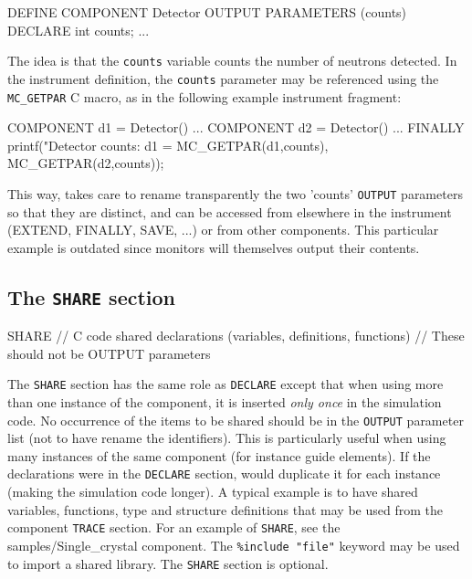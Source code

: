\begin{mcstas}
DEFINE COMPONENT Detector
OUTPUT PARAMETERS (counts)
DECLARE
  int counts;
...
\end{mcstas}

The idea is that the \texttt{counts} variable counts the number of neutrons detected. In
the instrument definition, the \texttt{counts} parameter may be referenced using
the \verb+MC_GETPAR+ C macro, as in the following example instrument
fragment:\label{mcgetpar}

\begin{mcstas}
COMPONENT d1 = Detector()
...
COMPONENT d2 = Detector()
...
FINALLY
  printf("Detector counts: d1 = %
         MC_GETPAR(d1,counts), MC_GETPAR(d2,counts));
\end{mcstas}

This way, \MCS takes care to rename transparently the two 'counts'
\texttt{OUTPUT} parameters so that they are distinct, and can be accessed from
elsewhere in the instrument (EXTEND, FINALLY, SAVE, ...)  or from other
components. This particular example is outdated since \MCS monitors will
themselves output their contents.

\subsection{The \texttt{SHARE} section}
\label{s:comp-share}
\begin{mcstas}
SHARE
// C code shared declarations (variables, definitions, functions)
// These should not be OUTPUT parameters
\end{mcstas}


The \texttt{SHARE} section has the same role as \texttt{DECLARE} except that
when using more than one instance of the component, it is inserted \emph{only
  once} in the simulation code. No occurrence of the items to be shared should be
in the \texttt{OUTPUT} parameter list (not to have \MCS rename the
identifiers).  This is particularly useful when using many instances of the same
component (for instance guide elements). If the declarations were in the
\texttt{DECLARE} section, \MCS would duplicate it for each instance (making the
simulation code longer).  A typical example is to have shared variables,
functions, type and structure definitions that may be used from the component
\texttt{TRACE} section. For an example of \texttt{SHARE}, see the
samples/Single\_crystal component. The \verb+%include "file"+ keyword may be
used to import
a shared library. The \texttt{SHARE} section is optional.

